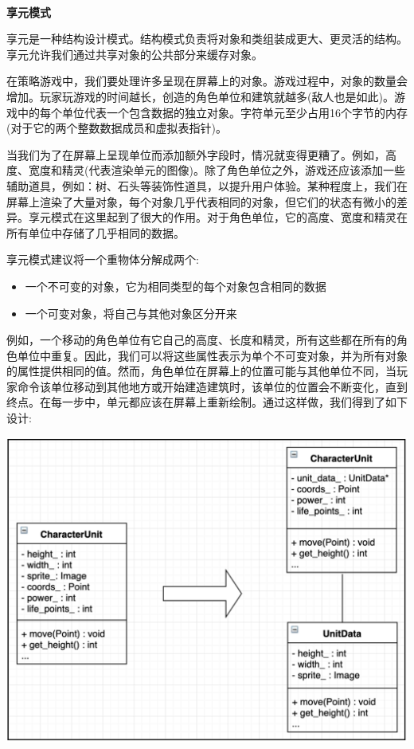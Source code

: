 \noindent\textbf{}\ \par
\textbf{享元模式} \ \par
享元是一种结构设计模式。结构模式负责将对象和类组装成更大、更灵活的结构。享元允许我们通过共享对象的公共部分来缓存对象。 \par
在策略游戏中，我们要处理许多呈现在屏幕上的对象。游戏过程中，对象的数量会增加。玩家玩游戏的时间越长，创造的角色单位和建筑就越多(敌人也是如此)。游戏中的每个单位代表一个包含数据的独立对象。字符单元至少占用16个字节的内存(对于它的两个整数数据成员和虚拟表指针)。 \par
当我们为了在屏幕上呈现单位而添加额外字段时，情况就变得更糟了。例如，高度、宽度和精灵(代表渲染单元的图像)。除了角色单位之外，游戏还应该添加一些辅助道具，例如：树、石头等装饰性道具，以提升用户体验。某种程度上，我们在屏幕上渲染了大量对象，每个对象几乎代表相同的对象，但它们的状态有微小的差异。享元模式在这里起到了很大的作用。对于角色单位，它的高度、宽度和精灵在所有单位中存储了几乎相同的数据。 \par
享元模式建议将一个重物体分解成两个: \par

\begin{itemize}
	\item 一个不可变的对象，它为相同类型的每个对象包含相同的数据
	\item 一个可变对象，将自己与其他对象区分开来
\end{itemize}

例如，一个移动的角色单位有它自己的高度、长度和精灵，所有这些都在所有的角色单位中重复。因此，我们可以将这些属性表示为单个不可变对象，并为所有对象的属性提供相同的值。然而，角色单位在屏幕上的位置可能与其他单位不同，当玩家命令该单位移动到其他地方或开始建造建筑时，该单位的位置会不断变化，直到终点。在每一步中，单元都应该在屏幕上重新绘制。通过这样做，我们得到了如下设计: \par

\begin{center}
	\includegraphics[width=1.0\textwidth]{content/Section-2/Chapter-11/11}
\end{center}

